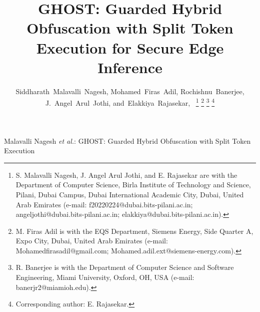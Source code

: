 \documentclass[lettersize,journal]{IEEEtran}
\begin{document}
\title{GHOST: Guarded Hybrid Obfuscation with Split Token Execution for Secure Edge Inference}
\author{Siddharath~Malavalli~Nagesh,
        Mohamed~Firas~Adil,
        Rochishnu~Banerjee,
        J.~Angel~Arul~Jothi,
        and~Elakkiya~Rajasekar,~%
\thanks{S. Malavalli Nagesh, J. Angel Arul Jothi, and E. Rajasekar are with the
Department of Computer Science, Birla Institute of Technology and Science,
Pilani, Dubai Campus, Dubai International Academic City, Dubai, United Arab
Emirates (e-mail: f20220224@dubai.bits-pilani.ac.in;
angeljothi@dubai.bits-pilani.ac.in; elakkiya@dubai.bits-pilani.ac.in).}%
\thanks{M. Firas Adil is with the EQS Department, Siemens Energy,
Side Quarter A, Expo City, Dubai, United Arab Emirates
(e-mail: Mohamedfirasadil@gmail.com; Mohamed.adil.ext@siemens-energy.com).}%
\thanks{R. Banerjee is with the Department of Computer Science and
Software Engineering, Miami University, Oxford, OH, USA
(e-mail: banerjr2@miamioh.edu).}%
\thanks{Corresponding author: E. Rajasekar.}%
}
%
{Malavalli Nagesh \MakeLowercase{\textit{et al.}}: GHOST: Guarded Hybrid Obfuscation with Split Token Execution}
\maketitle
\end{document}
